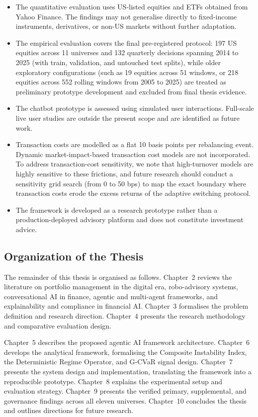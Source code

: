 \documentclass[11pt]{article}
\begin{document}
\begin{itemize}
  \item The quantitative evaluation uses US-listed equities and ETFs obtained from Yahoo Finance. The findings may not generalise directly to fixed-income instruments, derivatives, or non-US markets without further adaptation.
  \item The empirical evaluation covers the final pre-registered protocol: 197 US equities across 11 universes and 132 quarterly decisions spanning 2014 to 2025 (with train, validation, and untouched test splits), while older exploratory configurations (such as 19 equities across 51 windows, or 218 equities across 552 rolling windows from 2005 to 2025) are treated as preliminary prototype development and excluded from final thesis evidence.
  \item The chatbot prototype is assessed using simulated user interactions. Full-scale live user studies are outside the present scope and are identified as future work.
  \item Transaction costs are modelled as a flat 10 basis points per rebalancing event. Dynamic market-impact-based transaction cost models are not incorporated. To address transaction-cost sensitivity, we note that high-turnover models are highly sensitive to these frictions, and future research should conduct a sensitivity grid search (from 0 to 50 bps) to map the exact boundary where transaction costs erode the excess returns of the adaptive switching protocol.
  \item The framework is developed as a research prototype rather than a production-deployed advisory platform and does not constitute investment advice.
\end{itemize}

\subsection{Organization of the Thesis}
The remainder of this thesis is organised as follows. Chapter~2 reviews the literature on portfolio management in the digital era, robo-advisory systems, conversational AI in finance, agentic and multi-agent frameworks, and explainability and compliance in financial AI. Chapter~3 formalises the problem definition and research direction. Chapter~4 presents the research methodology and comparative evaluation design.

Chapter~5 describes the proposed agentic AI framework architecture. Chapter~6 develops the analytical framework, formalising the Composite Instability Index, the Deterministic Regime Operator, and G-CVaR signal design. Chapter~7 presents the system design and implementation, translating the framework into a reproducible prototype. Chapter~8 explains the experimental setup and evaluation strategy. Chapter~9 presents the verified primary, supplemental, and governance findings across all eleven universes. Chapter~10 concludes the thesis and outlines directions for future research.
\end{document}
